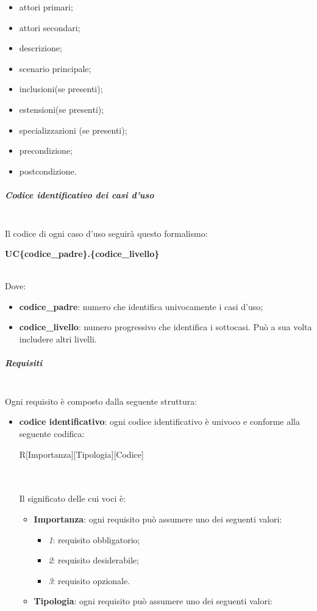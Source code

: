 \begin{itemize}
\begin{itemize}
	\item attori primari;
	\item attori secondari;
	\item descrizione;
	\item scenario principale;
	\item inclusioni(se presenti);
	\item estensioni(se presenti);
	\item specializzazioni (se presenti);
	\item precondizione;
	\item postcondizione.
\end{itemize}
\subparagraph{Codice identificativo dei casi d'uso} \mbox{}\\
Il codice di ogni caso d'uso seguirà questo formalismo: \\
\centerline{\textbf{UC\{codice\_padre\}.\{codice\_livello\}}} \\
Dove:
\begin{itemize}
	\item \textbf{codice\_padre}: numero che identifica univocamente i casi d'uso;
	\item \textbf{codice\_livello}: numero progressivo che identifica i sottocasi. Può a sua volta includere altri livelli.
\end{itemize}
\subparagraph{Requisiti} \mbox{}\\
Ogni requisito è composto dalla seguente struttura:
\begin{itemize}
	\item \textbf{codice identificativo}: ogni codice identificativo è univoco e conforme alla seguente codifica: \\
	\centerline{R[Importanza][Tipologia][Codice]} \\ \\
	Il significato delle cui voci è:
	\begin{itemize}
		\item \textbf{Importanza}: ogni requisito può assumere uno dei seguenti valori:
		\begin{itemize}
			\item \textit{1}: requisito obbligatorio;
			\item \textit{2}: requisito desiderabile;
			\item \textit{3}: requisito opzionale.
		\end{itemize}
		\item \textbf{Tipologia}: ogni requisito può assumere uno dei seguenti valori:

\end{itemize}
\end{itemize}
\end{itemize}
